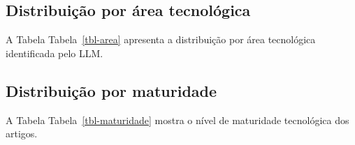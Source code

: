 \documentclass[
  brazilian,
  11pt,
  letterpaper,
  DIV=11,
  numbers=noendperiod]{scrartcl}
\begin{document}
\subsection{Distribuição por área
tecnológica}\label{distribuiuxe7uxe3o-por-uxe1rea-tecnoluxf3gica}

A Tabela Tabela~\ref{tbl-area} apresenta a distribuição por área
tecnológica identificada pelo LLM.

\begin{table}

\caption{\label{tbl-area}Distribuição por área tecnológica.}


\end{table}%

\subsection{Distribuição por
maturidade}\label{distribuiuxe7uxe3o-por-maturidade}

A Tabela Tabela~\ref{tbl-maturidade} mostra o nível de maturidade
tecnológica dos artigos.
\end{document}

